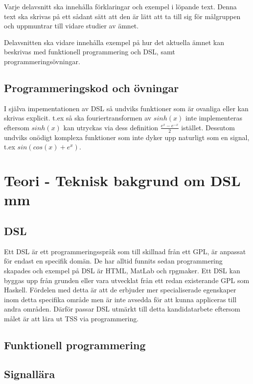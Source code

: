 \documentclass[]{article}
\begin{document}
Varje delavsnitt ska innehålla förklaringar och exempel i löpande text. Denna text ska skrivas på ett sådant sätt att den är lätt att ta till sig för målgruppen och uppmuntrar till vidare studier av ämnet.

Delavsnitten ska vidare innehålla exempel på hur det aktuella ämnet kan beskrivas med funktionell programmering och DSL, samt programmeringsövningar.

\subsection{Programmeringskod och övningar}

I själva impementationen av DSL så undviks funktioner som är
ovanliga eller kan skrivas explicit. t.ex så ska fouriertransformen av
$sinh(x)$ inte implementeras eftersom $sinh(x)$ kan utryckas via dess
definition $\frac{e^{x} - e^{-x}}{2}$ istället.
Dessutom undviks onödigt komplexa funktioner som inte
dyker upp naturligt som en signal, t.ex $sin(cos(x)+e^x)$.

\section{Teori - Teknisk bakgrund om DSL mm}

\subsection{DSL}
Ett DSL är ett programmeringsspråk som till skillnad från ett \gls{GPL}, är anpassat
för endast en specifik domän. De har alltid funnits sedan programmering
skapades och exempel på DSL är HTML, MatLab och rpgmaker. Ett DSL kan
byggas upp från grunden eller vara utvecklat från ett redan existerande GPL
som Haskell. Fördelen med detta är att de erbjuder mer specialiserade egenskaper
inom detta specifika område men är inte avsedda för att kunna appliceras till andra
områden. Därför passar DSL utmärkt till detta kandidatarbete eftersom målet är
att lära ut TSS via programmering.

\subsection{Funktionell programmering}

\subsection{Signallära}
\end{document}
